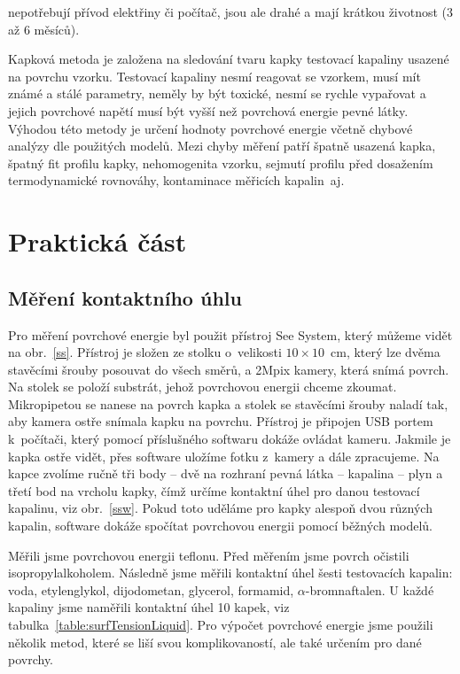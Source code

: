 \documentclass{protokol}
\begin{document}
nepotřebují přívod elektřiny či počítač, jsou ale drahé a mají krátkou 
životnost (3 až 6 měsíců).
\par Kapková metoda je založena na sledování tvaru kapky testovací kapaliny 
usazené na povrchu vzorku. Testovací kapaliny nesmí reagovat se vzorkem, musí 
mít známé a stálé parametry, neměly by být toxické, nesmí se rychle vypařovat a 
jejich povrchové napětí musí být vyšší než povrchová energie pevné látky. 
Výhodou této metody je určení hodnoty povrchové energie včetně chybové analýzy 
dle použitých modelů. Mezi chyby měření patří špatně usazená kapka, špatný fit 
profilu kapky, nehomogenita vzorku, sejmutí profilu před dosažením 
termodynamické rovnováhy, kontaminace měřicích kapalin~aj.

\section{Praktická část}
\subsection{Měření kontaktního úhlu}
\par Pro měření povrchové energie byl použit přístroj See System, který můžeme vidět na 
obr.~\ref{ss}. Přístroj je složen ze stolku o~velikosti $10 \times 10$~cm, 
který lze dvěma stavěcími šrouby posouvat do všech směrů, a 2Mpix kamery, která 
snímá povrch. Na stolek se položí substrát, jehož povrchovou energii chceme 
zkoumat. Mikropipetou se nanese na povrch kapka a stolek se stavěcími šrouby 
naladí tak, aby kamera ostře snímala kapku na povrchu. Přístroj je připojen USB 
portem k~počítači, který pomocí příslušného softwaru dokáže ovládat kameru. 
Jakmile je kapka ostře vidět, přes software uložíme fotku z~kamery a dále 
zpracujeme. Na kapce zvolíme ručně tři body -- dvě na rozhraní pevná látka -- 
kapalina -- plyn a třetí bod na vrcholu kapky, čímž určíme kontaktní úhel pro 
danou testovací kapalinu, viz obr.~\ref{ssw}. Pokud toto uděláme pro kapky 
alespoň dvou různých kapalin, software dokáže spočítat povrchovou energii 
pomocí běžných modelů. 
\par Měřili jsme povrchovou energii teflonu. Před měřením jsme povrch očistili 
isopropylalkoholem. Následně jsme měřili kontaktní úhel šesti testovacích 
kapalin: voda, etylenglykol, dijodometan, glycerol, formamid, 
$\alpha$-bromnaftalen. U každé kapaliny jsme naměřili kontaktní úhel 10 
kapek, viz tabulka~\ref{table:surfTensionLiquid}. Pro výpočet povrchové 
energie jsme použili několik metod, které se liší svou komplikovaností, ale 
také určením pro dané povrchy.
\end{document}

